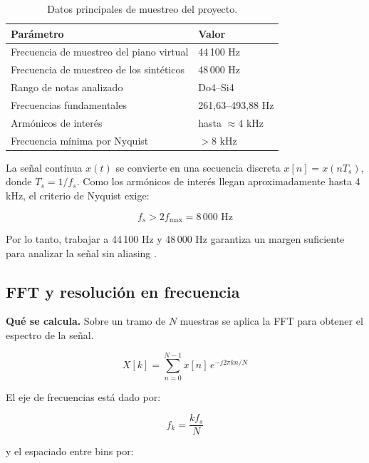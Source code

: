 \documentclass[12pt]{article}
\begin{document}
\begin{table}[ht]
  \centering
  \small
  \begin{tabular}{ll}
    \toprule
    \rowcolor{TableHead}
    Parámetro & Valor \\
    \midrule
    Frecuencia de muestreo del piano virtual & 44\,100 Hz \\
    Frecuencia de muestreo de los sintéticos & 48\,000 Hz \\
    Rango de notas analizado & Do4--Si4 \\
    Frecuencias fundamentales & 261,63--493,88 Hz \\
    Armónicos de interés & hasta $\approx 4$ kHz \\
    Frecuencia mínima por Nyquist & $> 8$ kHz \\
    \bottomrule
  \end{tabular}
  \caption{Datos principales de muestreo del proyecto.}
  \label{tab:muestreo}
\end{table}

La señal continua $x(t)$ se convierte en una secuencia discreta $x[n]=x(nT_s)$,
donde $T_s=1/f_s$. Como los armónicos de interés llegan aproximadamente hasta 4 kHz,
el criterio de Nyquist exige:

\begin{equation}
f_s > 2f_{\max} = 8\,000 \text{ Hz}
\end{equation}

Por lo tanto, trabajar a 44\,100 Hz y 48\,000 Hz garantiza un margen suficiente para
analizar la señal sin aliasing \cite{oppenheim2010,rossing1990science}.

\subsection{FFT y resolución en frecuencia}

\textbf{Qué se calcula.}
Sobre un tramo de $N$ muestras se aplica la FFT para obtener el espectro de la señal.

\begin{equation}
X[k] = \sum_{n=0}^{N-1} x[n]\, e^{-j2\pi kn/N}
\end{equation}

El eje de frecuencias está dado por:

\begin{equation}
f_k = \frac{k f_s}{N}
\end{equation}

y el espaciado entre bins por:
\end{document}
